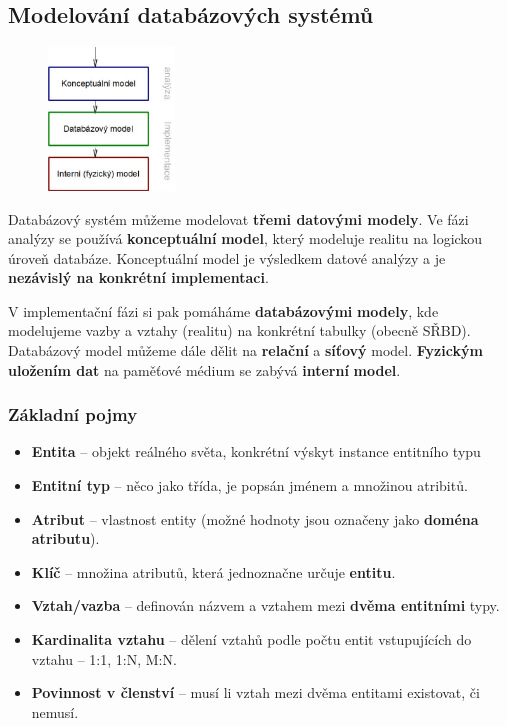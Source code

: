 \subsection{Modelování databázových systémů}
\begin{figure}[H]
	\centering
	\includegraphics[width=0.3\textwidth]{assets/modelovani.png}
\end{figure}

Databázový systém můžeme modelovat \textbf{třemi datovými modely}. Ve fázi analýzy se používá \textbf{konceptuální} \textbf{model}, který modeluje realitu na logickou úroveň databáze. Konceptuální model je výsledkem datové analýzy a je \textbf{nezávislý na konkrétní implementaci}. 

V implementační fázi si pak pomáháme \textbf{databázovými} \textbf{modely}, kde modelujeme vazby a vztahy (realitu) na konkrétní tabulky (obecně SŘBD). Databázový model můžeme dále dělit na \textbf{relační} a \textbf{síťový} model. \textbf{Fyzickým uložením dat} na paměťové médium se zabývá \textbf{interní} \textbf{model}.

\subsubsection{Základní pojmy}
\begin{itemize}
	\item \textbf{Entita} -- objekt reálného světa, konkrétní výskyt instance entitního typu
	\item \textbf{Entitní typ} -- něco jako třída, je popsán jménem a množinou atribitů.
	\item \textbf{Atribut} -- vlastnost entity (možné hodnoty jsou označeny jako \textbf{doména atributu}).
	\item \textbf{Klíč} -- množina atributů, která jednoznačne určuje \textbf{entitu}.
	\item \textbf{Vztah/vazba} -- definován názvem a vztahem mezi \textbf{dvěma entitními} typy.
	\item \textbf{Kardinalita vztahu} -- dělení vztahů podle počtu entit vstupujících do vztahu -- 1:1, 1:N, M:N.
	\item \textbf{Povinnost v členství} -- musí li vztah mezi dvěma entitami existovat, či nemusí.
\end{itemize}

